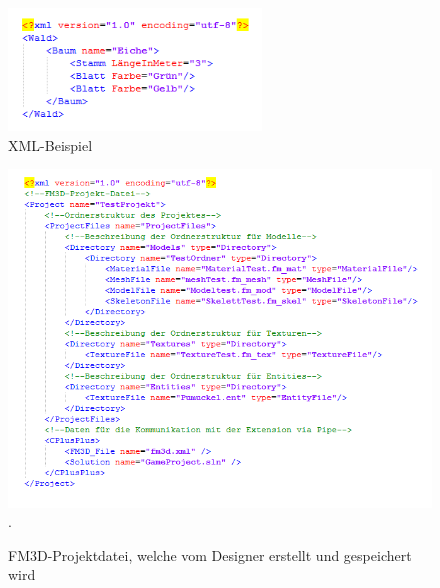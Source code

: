 \begin{figure}
	\begin{center}
		\includegraphics[width=0.6\textwidth]{03unserprogramm/Designer/xmlbsp.png}
		\caption{XML-Beispiel}\label{xmlbsp}
	\end{center}
\end{figure}
\begin{figure}
	\begin{center}
		\includegraphics[width=\textwidth]{03unserprogramm/Designer/FM3DProjektdatei.PNG}.
		\caption{FM3D-Projektdatei, welche vom Designer erstellt und gespeichert wird}\label{fm3dprojekt}
	\end{center}
\end{figure}